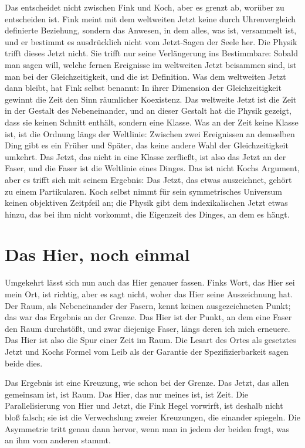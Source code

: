 Das entscheidet nicht zwischen Fink und Koch, aber es grenzt ab, worüber zu entscheiden ist. Fink meint mit dem weltweiten Jetzt keine durch Uhrenvergleich definierte Beziehung, sondern das Anwesen, in dem alles, was ist, versammelt ist, und er bestimmt es ausdrücklich nicht vom Jetzt-Sagen der Seele her. Die Physik trifft dieses Jetzt nicht. Sie trifft nur seine Verlängerung ins Bestimmbare: Sobald man sagen will, welche fernen Ereignisse im weltweiten Jetzt beisammen sind, ist man bei der Gleichzeitigkeit, und die ist Definition. Was dem weltweiten Jetzt dann bleibt, hat Fink selbst benannt: In ihrer Dimension der Gleichzeitigkeit gewinnt die Zeit den Sinn räumlicher Koexistenz. Das weltweite Jetzt ist die Zeit in der Gestalt des Nebeneinander, und an dieser Gestalt hat die Physik gezeigt, dass sie keinen Schnitt enthält, sondern eine Klasse. Was an der Zeit keine Klasse ist, ist die Ordnung längs der Weltlinie: Zwischen zwei Ereignissen an demselben Ding gibt es ein Früher und Später, das keine andere Wahl der Gleichzeitigkeit umkehrt. Das Jetzt, das nicht in eine Klasse zerfließt, ist also das Jetzt an der Faser, und die Faser ist die Weltlinie eines Dinges. Das ist nicht Kochs Argument, aber es trifft sich mit seinem Ergebnis: Das Jetzt, das etwas auszeichnet, gehört zu einem Partikularen. Koch selbst nimmt für sein symmetrisches Universum keinen objektiven Zeitpfeil an; die Physik gibt dem indexikalischen Jetzt etwas hinzu, das bei ihm nicht vorkommt, die Eigenzeit des Dinges, an dem es hängt.

\section{Das Hier, noch einmal}

Umgekehrt lässt sich nun auch das Hier genauer fassen. Finks Wort, das Hier sei mein Ort, ist richtig, aber es sagt nicht, woher das Hier seine Auszeichnung hat. Der Raum, als Nebeneinander der Fasern, kennt keinen ausgezeichneten Punkt; das war das Ergebnis an der Grenze. Das Hier ist der Punkt, an dem eine Faser den Raum durchstößt, und zwar diejenige Faser, längs deren ich mich erneuere. Das Hier ist also die Spur einer Zeit im Raum. Die Lesart des Ortes als gesetztes Jetzt und Kochs Formel vom Leib als der Garantie der Spezifizierbarkeit sagen beide dies.

Das Ergebnis ist eine Kreuzung, wie schon bei der Grenze. Das Jetzt, das allen gemeinsam ist, ist Raum. Das Hier, das nur meines ist, ist Zeit. Die Parallelisierung von Hier und Jetzt, die Fink Hegel vorwirft, ist deshalb nicht bloß falsch; sie ist die Verwechslung zweier Kreuzungen, die einander spiegeln. Die Asymmetrie tritt genau dann hervor, wenn man in jedem der beiden fragt, was an ihm vom anderen stammt.

